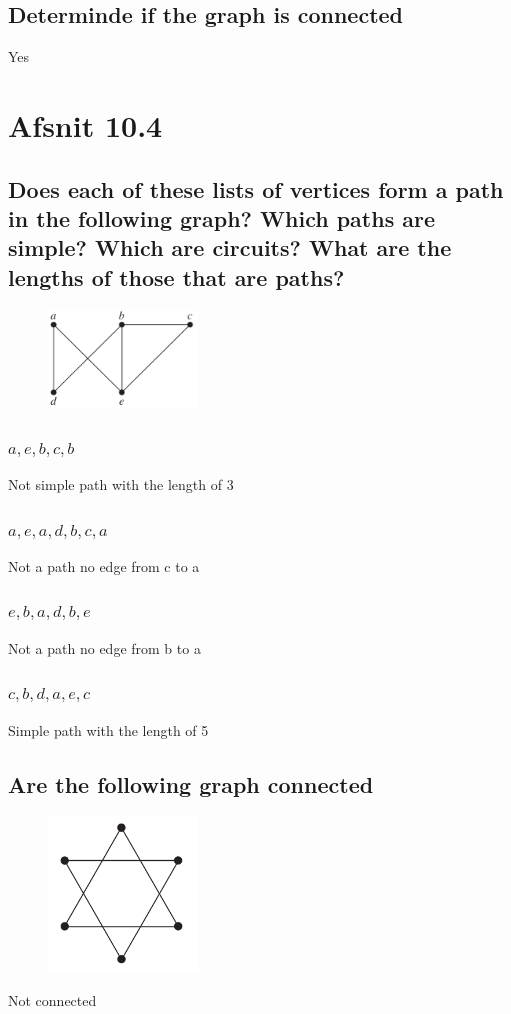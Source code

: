 \documentclass[12pt, a4paper]{report}
\begin{document}
		\subsection{Determinde if the graph is connected}
			Yes
	\setcounter{section}{1}
	\section{Afsnit 10.4}
		\subsection{Does each of these lists of vertices form a path in the following graph? Which paths are simple? Which are circuits? What are the lengths of those that are paths?}
			\begin{figure}[h!]
				\centering
				\includegraphics[width=150px]{assets/10,4,1.png}
				\label{}
				\caption{}
			\end{figure}	
			\subsubsection{$a,e,b,c,b$}
				Not simple path with the length of 3
			\subsubsection{$a,e,a,d,b,c,a$}
				Not a path no edge from c to a
			\subsubsection{$e,b,a,d,b,e$}
				Not a path no edge from b to a
			\subsubsection{$c,b,d,a,e,c$}
				Simple path with the length of 5
		\setcounter{subsection}{4}
		\subsection{Are the following graph connected}
			\begin{figure}[h!]
				\centering
				\includegraphics[width=150px]{assets/10.4.5.png}
				\label{}
				\caption{}
			\end{figure}
			Not connected	
\end{document}
